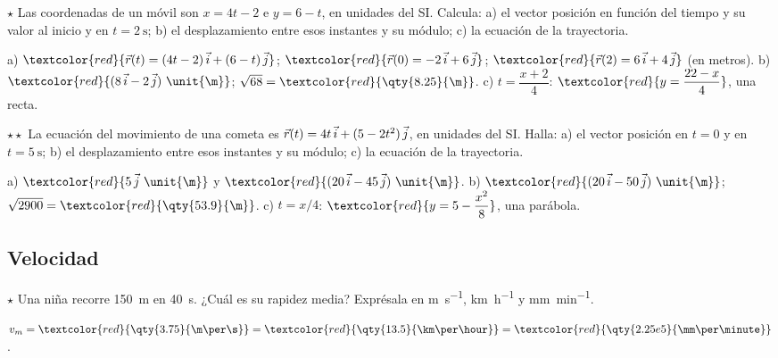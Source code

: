 \begin{exercise}
    \(\star\) Las coordenadas de un móvil son \(x = 4t - 2\) e \(y = 6 - t\), en unidades del SI. Calcula: a) el vector posición en
    función del tiempo y su valor al inicio y en \(t = \qty{2}{\s}\); b) el desplazamiento entre esos instantes y su módulo; c) la
    ecuación de la trayectoria.
    \begin{solu}
        a) \(\textcolor{red}{\vec r(t) = (4t - 2)\,\ivec + (6 - t)\,\jvec}\); \(\textcolor{red}{\vec r(0) = -2\,\ivec + 6\,\jvec}\);
        \(\textcolor{red}{\vec r(2) = 6\,\ivec + 4\,\jvec}\) (en metros). b) \(\textcolor{red}{(8\,\ivec - 2\,\jvec)~\unit{\m}}\);
        \(\sqrt{68} = \textcolor{red}{\qty{8.25}{\m}}\). c) \(t = \dfrac{x + 2}{4}\): \(\textcolor{red}{y = \dfrac{22 - x}{4}}\), una recta.
    \end{solu}
\end{exercise}

\begin{exercise}
    \(\star\star\) La ecuación del movimiento de una cometa es \(\vec r(t) = 4t\,\vec{i} + (5 - 2t^2)\,\vec{j}\), en unidades del SI.
    Halla: a) el vector posición en \(t = 0\) y en \(t = \qty{5}{\s}\); b) el desplazamiento entre esos instantes y su módulo;
    c) la ecuación de la trayectoria.
    \begin{solu}
        a) \(\textcolor{red}{5\,\jvec~\unit{\m}}\) y \(\textcolor{red}{(20\,\ivec - 45\,\jvec)~\unit{\m}}\).
        b) \(\textcolor{red}{(20\,\ivec - 50\,\jvec)~\unit{\m}}\); \(\sqrt{2900} = \textcolor{red}{\qty{53.9}{\m}}\).
        c) \(t = x/4\): \(\textcolor{red}{y = 5 - \dfrac{x^2}{8}}\), una parábola.
    \end{solu}
\end{exercise}

\subsection{Velocidad}

\begin{exercise}
    \(\star\) Una niña recorre \qty{150}{\m} en \qty{40}{\s}. ¿Cuál es su rapidez media? Exprésala en \unit{\m\per\s},
    \unit{\km\per\hour} y \unit{\mm\per\minute}.
    \begin{solu}
        \(v_m = \textcolor{red}{\qty{3.75}{\m\per\s}} = \textcolor{red}{\qty{13.5}{\km\per\hour}} = \textcolor{red}{\qty{2.25e5}{\mm\per\minute}}\).
    \end{solu}
\end{exercise}

